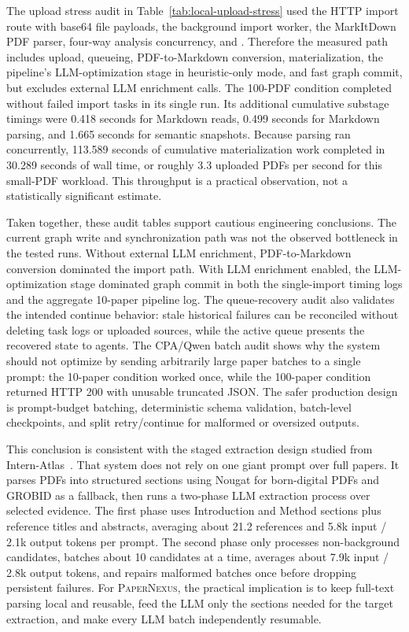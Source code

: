 \documentclass[11pt]{article}
\newcommand{\papernexus}{\textsc{PaperNexus}}
\newcommand{\code}[1]{\texttt{\detokenize{#1}}}
\begin{document}
The upload stress audit in Table~\ref{tab:local-upload-stress} used the HTTP import route with base64 file payloads, the background import worker, the MarkItDown PDF parser, four-way analysis concurrency, and \code{semanticExtraction=heuristic-only}. Therefore the measured path includes upload, queueing, PDF-to-Markdown conversion, materialization, the pipeline's LLM-optimization stage in heuristic-only mode, and fast graph commit, but excludes external LLM enrichment calls. The 100-PDF condition completed without failed import tasks in its single run. Its additional cumulative substage timings were 0.418 seconds for Markdown reads, 0.499 seconds for Markdown parsing, and 1.665 seconds for semantic snapshots. Because parsing ran concurrently, 113.589 seconds of cumulative materialization work completed in 30.289 seconds of wall time, or roughly 3.3 uploaded PDFs per second for this small-PDF workload. This throughput is a practical observation, not a statistically significant estimate.

Taken together, these audit tables support cautious engineering conclusions. The current graph write and synchronization path was not the observed bottleneck in the tested runs. Without external LLM enrichment, PDF-to-Markdown conversion dominated the import path. With LLM enrichment enabled, the LLM-optimization stage dominated graph commit in both the single-import timing logs and the aggregate 10-paper pipeline log. The queue-recovery audit also validates the intended continue behavior: stale historical failures can be reconciled without deleting task logs or uploaded sources, while the active queue presents the recovered state to agents. The CPA/Qwen batch audit shows why the system should not optimize by sending arbitrarily large paper batches to a single prompt: the 10-paper condition worked once, while the 100-paper condition returned HTTP 200 with unusable truncated JSON. The safer production design is prompt-budget batching, deterministic schema validation, batch-level checkpoints, and split retry/continue for malformed or oversized outputs.

This conclusion is consistent with the staged extraction design studied from Intern-Atlas~\citep{internatlas}. That system does not rely on one giant prompt over full papers. It parses PDFs into structured sections using Nougat for born-digital PDFs and GROBID as a fallback, then runs a two-phase LLM extraction process over selected evidence. The first phase uses Introduction and Method sections plus reference titles and abstracts, averaging about 21.2 references and 5.8k input / 2.1k output tokens per prompt. The second phase only processes non-background candidates, batches about 10 candidates at a time, averages about 7.9k input / 2.8k output tokens, and repairs malformed batches once before dropping persistent failures. For \papernexus{}, the practical implication is to keep full-text parsing local and reusable, feed the LLM only the sections needed for the target extraction, and make every LLM batch independently resumable.
\end{document}
